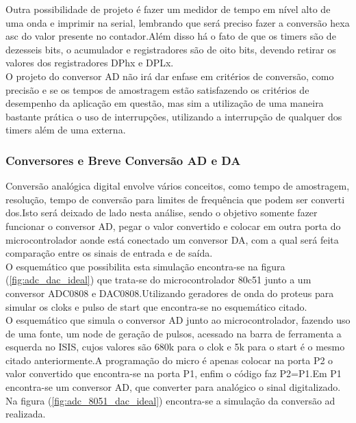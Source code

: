 \documentclass{Fabiano_file}
\begin{document}
{Outra possibilidade de projeto é fazer um medidor de tempo em nível alto de uma onda e imprimir na serial, lembrando que será preciso fazer a conversão hexa asc 
do valor presente no contador.Além disso há o fato de que os timers são de dezesseis bits, o acumulador e registradores são de oito bits,
devendo retirar os valores dos registradores DPhx e DPLx.\\

O projeto do conversor AD não irá dar enfase em critérios de conversão, como precisão e se os tempos de amostragem estão satisfazendo os critérios de desempenho
da aplicação em questão, mas sim a utilização de uma maneira bastante prática o uso de interrupções, utilizando a interrupção de qualquer dos timers além de uma 
externa.

\subsubsection{Conversores e Breve Conversão AD e DA}
Conversão analógica digital envolve vários conceitos, como tempo de amostragem, resolução, tempo de conversão para limites de frequência que podem ser converti
dos.Isto será deixado de lado nesta análise, sendo o objetivo somente fazer funcionar o conversor AD, pegar o valor convertido e colocar em outra porta do microcontrolador
aonde está conectado um conversor DA, com a qual será feita comparação entre os sinais de entrada e de saída.\\

O esquemático que possibilita esta simulação encontra-se na figura (\ref{fig:adc_dac_ideal}) que trata-se do microcontrolador 80c51 junto a um conversor ADC0808 e DAC0808.Utilizando
geradores de onda do proteus para simular os cloks e pulso de start que encontra-se no esquemático citado.\\

O esquemático que simula o conversor AD junto ao microcontrolador, fazendo uso de uma fonte, um node de geração de pulsos, acessado na barra de ferramenta a 
esquerda no ISIS, cujos valores são 680k para o clok e 5k para o start é o mesmo citado anteriormente.A programação do micro é apenas colocar na porta P2 
o valor convertido que encontra-se na porta P1, enfim o código faz P2=P1.Em P1 encontra-se um conversor AD, que converter para analógico o sinal digitalizado.
Na figura (\ref{fig:adc_8051_dac_ideal}) encontra-se a simulação da conversão ad realizada.

}
\end{document}
